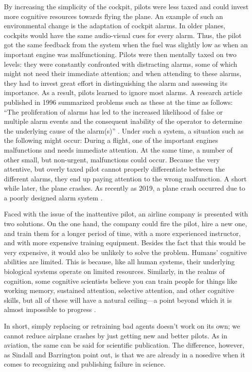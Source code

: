 \documentclass{article}
\begin{document}
By increasing the simplicity of the cockpit, pilots were less taxed and could invest more cognitive resources towards flying the plane. An example of such an environmental change is the adaptation of cockpit alarms. In older planes, cockpits would have the same audio-visual cues for every alarm. Thus, the pilot got the same feedback from the system when the fuel was slightly low as when an important engine was malfunctioning. Pilots were then mentally taxed on two levels: they were constantly confronted with distracting alarms, some of which might not need their immediate attention; and when attending to these alarms, they had to invest great effort in distinguishing the alarm and assessing its importance. As a result, pilots learned to ignore most alarms. A research article published in 1996 summarized problems such as these at the time as follows: “The proliferation of alarms has led to the increased likelihood of false or multiple alarm events and the consequent inability of the operator to determine the underlying cause of the alarm(s)” \parencite[pp. 12][]{Gilson1996}. Under such a system, a situation such as the following might occur: During a flight, one of the important engines malfunctions and needs immediate attention. At the same time, a number of other small, but non-urgent, malfunctions could occur. Because the very attentive, but overly taxed pilot cannot properly differentiate between the different alarms, they end up paying attention to the wrong malfunction. A short while later, the plane crashes. As recently as 2019, a plane crash occurred due to a poorly designed alarm system \parencite{Levin2019}. 

Faced with the issue of the inattentive pilot, an airline company is presented with two solutions. On the one hand, the company could fire the pilot, hire a new one, and train them for a longer period of time, with a more experienced instructor, and with more expensive training equipment. Besides the fact that this would be very expensive, it would also be unlikely to solve the problem. Humans' cognitive abilities are limited. This is because, like all human systems, their underlying biological systems operate on limited resources. Similarly, in the realms of cognition, some cognitive scientists believe you can train people for things like working memory, sustained attention, selective attention, and other cognitive skills, but all of these will have a natural ceiling—a point beyond which it is almost impossible to progress \parencite{Kwok2011, Traut2021}. 

In short, simply replacing or retraining bad agents doesn't work on its own; we cannot reduce airplane crashes by just getting new and better pilots. As in aviation, the same can be said for scientific publication. The difference, however, as Sindall and Barrington point out, is that we are already in a nosedive when it comes to recognizing and publishing failure in science. 
\end{document}
